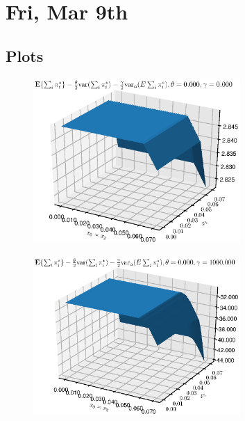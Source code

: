 \section{Fri, Mar 9th}
\subsection{Plots}
\begin{figure}[htbp] %
   \centering
   \includegraphics[width=0.7\textwidth]{Figures/AToy/Atoy-FCP000000} 
\end{figure}
\begin{figure}[htbp] %
   \centering
   \includegraphics[width=0.7\textwidth]{Figures/AToy/Atoy-FCP000100000} 
\end{figure}

